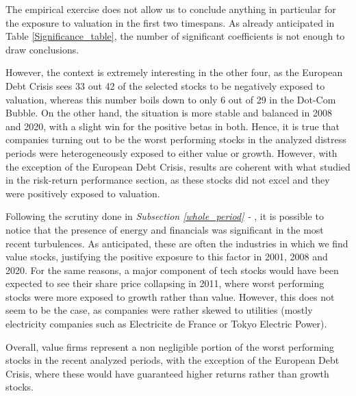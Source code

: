 \documentclass[12pt]{article}
\begin{document}
The empirical exercise does not allow us to conclude anything in particular for the exposure to valuation in the first two timespans. As already anticipated in Table \ref{Significance_table}, the number of significant coefficients is not enough to draw conclusions.

However, the context is extremely interesting in the other four,  as the European Debt Crisis sees 33 out 42 of the selected stocks to be negatively exposed to valuation, whereas this number boils down to only 6 out of 29 in the Dot-Com Bubble. On the other hand, the situation is more stable and balanced in 2008 and 2020, with a slight win for the positive betas in both. Hence, it is true that companies turning out to be the worst performing stocks in the analyzed distress periods were heterogeneously exposed to either value or growth. However, with the exception of the European Debt Crisis, results are coherent with what studied in the risk-return performance section, as these stocks did not excel and they were positively exposed to valuation. 

Following the scrutiny done in \textit{Subsection \ref{whole_period} - }, it is possible to notice that the presence of energy and financials was significant in the most recent turbulences. As anticipated, these are often the industries in which we find value stocks, justifying the positive exposure to this factor in 2001, 2008 and 2020. For the same reasons, a major component of tech stocks would have been expected to see their share price collapsing in 2011, where worst performing stocks were more exposed to growth rather than value. However, this does not seem to be the case, as companies were rather skewed to utilities (mostly electricity companies such as Electricite de France or Tokyo Electric Power).

Overall, value firms represent a non negligible portion of the worst performing stocks in the recent analyzed periods, with the exception of the European Debt Crisis, where these would have guaranteed higher returns rather than growth stocks.
\end{document}
